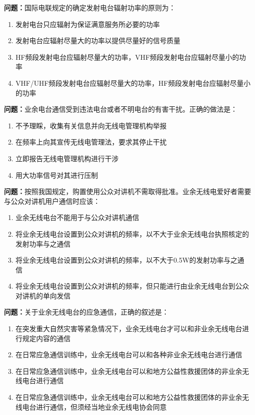 \textbf{问题：}国际电联规定的确定发射电台辐射功率的原则为：
\begin{enumerate}[label=\Alph*), leftmargin=1cm]
	\item 发射电台只应辐射为保证满意服务所必要的功率
	\item 发射电台应辐射尽量大的功率以提供尽量好的信号质量
	\item HF频段发射电台应辐射尽量大的功率，VHF频段发射电台应辐射尽量小的功率
	\item VHF/UHF频段发射电台应辐射尽量大的功率，HF频段发射电台应辐射尽量小的功率
\end{enumerate}

\textbf{问题：}业余电台通信受到违法电台或者不明电台的有害干扰。正确的做法是：
\begin{enumerate}[label=\Alph*), leftmargin=1cm]
	\item 不予理睬，收集有关信息并向无线电管理机构举报
	\item 在频率上向其宣传无线电管理法，要求其停止干扰
	\item 立即报告无线电管理机构进行干涉
	\item 用大功率信号对其进行压制
\end{enumerate}

\textbf{问题：}按照我国规定，购置使用公众对讲机不需取得批准。业余无线电爱好者需要与公众对讲机用户通信时应该：
\begin{enumerate}[label=\Alph*), leftmargin=1cm]
	\item 业余无线电台不能用于与公众对讲机通信
	\item 将业余无线电台设置到公众对讲机的频率，以不大于业余无线电台执照核定的发射功率与之通信
	\item 将业余无线电台设置到公众对讲机的频率，以不大于0.5W的发射功率与之通信
	\item 将业余无线电台设置到公众对讲机的频率，但只能进行由业余无线电台到公众对讲机的单向发信
\end{enumerate}

\textbf{问题：}关于业余无线电台的应急通信，正确的叙述是：
\begin{enumerate}[label=\Alph*), leftmargin=1cm]
	\item 在突发重大自然灾害等紧急情况下，业余无线电台才可以和非业余无线电台进行规定内容的通信
	\item 在日常应急通信训练中，业余无线电台可以和各种非业余无线电台进行通信
	\item 在日常应急通信训练中，业余无线电台可以和地方公益性救援团体的非业余无线电台进行通信
	\item 在日常应急通信训练中，业余无线电台可以和地方公益性救援团体的非业余无线电台进行通信，但须经当地业余无线电协会同意
\end{enumerate}

